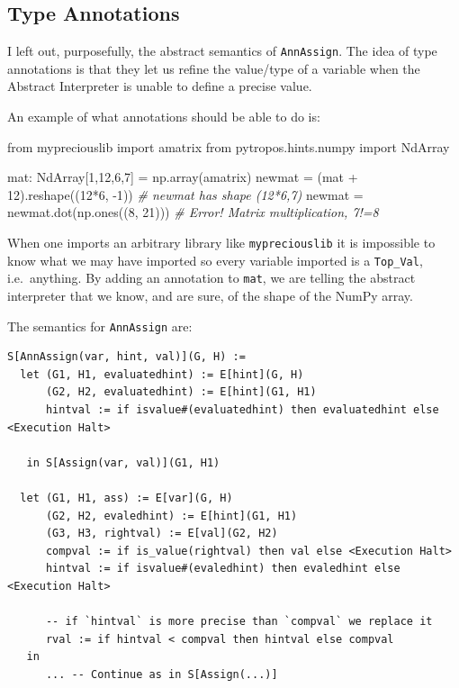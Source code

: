 \documentclass[
11pt, %
english, %
singlespacing, %
headsepline, %
]{MastersDoctoralThesis} %
\newenvironment{Shaded}{}{}
\newcommand{\CommentTok}[1]{\textcolor[rgb]{0.38,0.63,0.69}{\textit{#1}}}
\newcommand{\DecValTok}[1]{\textcolor[rgb]{0.25,0.63,0.44}{#1}}
\newcommand{\ImportTok}[1]{#1}
\newcommand{\NormalTok}[1]{#1}
\newcommand{\OperatorTok}[1]{\textcolor[rgb]{0.40,0.40,0.40}{#1}}
\begin{document}
\hypertarget{type-annotations}{%
\subsection{Type Annotations}\label{type-annotations}}

I left out, purposefully, the abstract semantics of \texttt{AnnAssign}.
The idea of type annotations is that they let us refine the value/type
of a variable when the Abstract Interpreter is unable to define a
precise value.

An example of what annotations should be able to do is:

\begin{Shaded}
\begin{Highlighting}[]
\ImportTok{from}\NormalTok{ mypreciouslib }\ImportTok{import}\NormalTok{ amatrix}
\ImportTok{from}\NormalTok{ pytropos.hints.numpy }\ImportTok{import}\NormalTok{ NdArray}

\NormalTok{mat: NdArray[}\DecValTok{1}\NormalTok{,}\DecValTok{12}\NormalTok{,}\DecValTok{6}\NormalTok{,}\DecValTok{7}\NormalTok{] }\OperatorTok{=}\NormalTok{ np.array(amatrix)}
\NormalTok{newmat }\OperatorTok{=}\NormalTok{ (mat }\OperatorTok{+} \DecValTok{12}\NormalTok{).reshape((}\DecValTok{12}\OperatorTok{*}\DecValTok{6}\NormalTok{, }\DecValTok{-1}\NormalTok{))  }\CommentTok{# newmat has shape (12*6,7)}
\NormalTok{newmat }\OperatorTok{=}\NormalTok{ newmat.dot(np.ones((}\DecValTok{8}\NormalTok{, }\DecValTok{21}\NormalTok{)))  }\CommentTok{# Error! Matrix multiplication, 7!=8}
\end{Highlighting}
\end{Shaded}

When one imports an arbitrary library like \texttt{mypreciouslib} it is
impossible to know what we may have imported so every variable imported
is a \texttt{Top\_Val}, i.e.~anything. By adding an annotation to
\texttt{mat}, we are telling the abstract interpreter that we know, and
are sure, of the shape of the NumPy array.

The semantics for \texttt{AnnAssign} are:

\begin{verbatim}
S[AnnAssign(var, hint, val)](G, H) :=
  let (G1, H1, evaluatedhint) := E[hint](G, H)
      (G2, H2, evaluatedhint) := E[hint](G1, H1)
      hintval := if isvalue#(evaluatedhint) then evaluatedhint else <Execution Halt>

   in S[Assign(var, val)](G1, H1)

  let (G1, H1, ass) := E[var](G, H)
      (G2, H2, evaledhint) := E[hint](G1, H1)
      (G3, H3, rightval) := E[val](G2, H2)
      compval := if is_value(rightval) then val else <Execution Halt>
      hintval := if isvalue#(evaledhint) then evaledhint else <Execution Halt>

      -- if `hintval` is more precise than `compval` we replace it
      rval := if hintval < compval then hintval else compval
   in
      ... -- Continue as in S[Assign(...)]
\end{verbatim}
\end{document}
